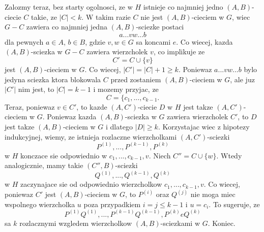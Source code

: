 Zalozmy teraz, bez starty ogolnosci, ze w $H$ istnieje co najmniej jedno $(A,B)$-ciecie $C$ takie, ze $|C|<k$. W takim razie $C$ nie jest $(A, B)$-cieciem w $G$, wiec $G-C$ zawiera co najmniej jedna $(A, B)$-sciezke postaci
$$a...vw...b$$
dla pewnych $a\in A$, $b\in B$, gdzie $v,w\in G$ sa koncami $e$. Co wiecej, kazda $(A, B)$-sciezka w $G-C$ zawiera wierzcholek $v$, co implikuje ze
$$C'=C\cup\{v\}$$
jest $(A, B)$-cieciem w $G$. Co wiecej, $|C'|=|C|+1\geq k$. {\color{dyg}Poniewaz $a...vw...b$ bylo jedyna sciezka ktora blokowala $C$ przed zostaniem $(A,B)$-cieciem w $G$, ale juz $|C'|$ nim jest}, to $|C|=k-1$ i mozemy przyjac, ze
$$C=\{c_1,...,c_{k-1}.$$
Teraz, poniewaz $v\in C'$, to kazde $(A, C')$-ciecie $D$ w $H$ jest takze $(A, C')$-cieciem w $G$. Poniewaz kazda $(A, B)$-sciezka w $G$ zawiera wierzcholek $C'$, to $D$ jest takze $(A, B)$-cieciem w $G$ i dlatego $|D|\geq k$. Korzystajac wiec z hipotezy indukcyjnej, wiemy, ze istnieja rozlaczne wierzcholkami $(A, C')$-sciezki 
$$P^{(1)},...,P^{(k-1)},P^{(k)}$$ 
w $H$ konczace sie odpowiednio w $c_1,..., c_{k-1}, v$. Niech $C''=C\cup\{w\}$. Wtedy analogicznie, mamy takie $(C'', B)$-sciezki 
$$Q^{(1)},...,Q^{{(k-1)}},Q^{(k)}$$
w $H$ zaczynajace sie od odpowiednio wierzcholkow $c_1,..., c_{k-1}, v$. Co wiecej, poniewaz $C'$ jest $(A, B)$-cieciem w $G$, to $P^{(i)}$ oraz $Q^{(j)}$ nie moga miec wspolnego wierzcholka $u$ poza przypadkiem $i=j\leq k-1$ i $u=c_i$. To sugeruje, ze 
$$P^{(1)}Q^{(1)},...,P^{(k-1)}Q^{(k-1)},P^{(k)}eQ^{(k)}$$
sa $k$ rozlacznymi wzgledem wierzcholkow $(A, B)$-sciezkami w $G$. Koniec.